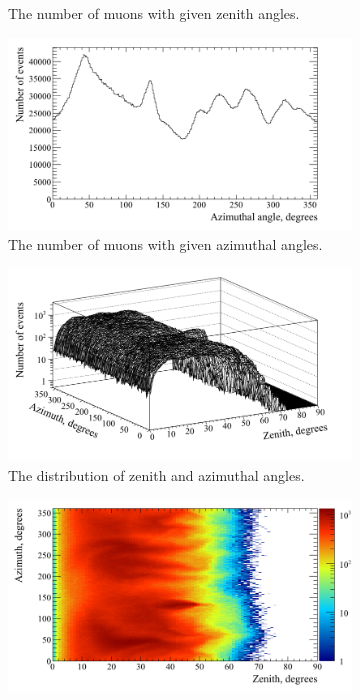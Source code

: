 \begin{figure}[h!]
\begin{subfigure}{0.45\textwidth}
    \caption{The number of muons with given zenith angles.}
  \end{subfigure}
  \hspace{0.08\textwidth}
  \begin{subfigure}{0.45\textwidth}
    \centering
    \includegraphics[width=\textwidth]{AzimuthCan}
    \caption{The number of muons with given azimuthal angles.}
  \end{subfigure}
  \begin{subfigure}{0.45\textwidth}
    \centering
    \includegraphics[width=\textwidth]{AziZenCan}
    \caption{The distribution of zenith and azimuthal angles.}
  \end{subfigure}
  \hspace{0.08\textwidth}
  \begin{subfigure}{0.45\textwidth}
    \centering
    \includegraphics[width=\textwidth]{AziZenColzCan}

\end{subfigure}
\end{figure}
